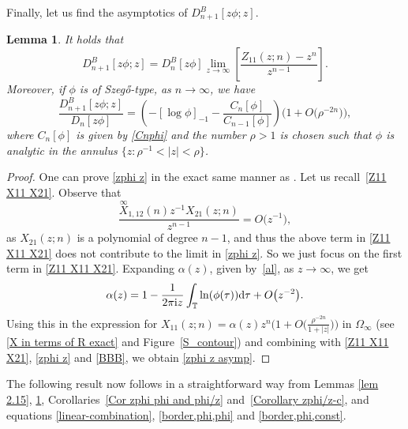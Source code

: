 \documentclass[10pt,a4paper]{amsart}
\numberwithin{equation}{section}
\newtheorem{Lemma}[Theorem]{Lemma}
 { \theoremstyle{definition}
\newtheorem{Definition}[Theorem]{Definition}
\newtheorem{Example}[Theorem]{Example}
\newtheorem{Remark}[Theorem]{Remark}
\newtheorem{Question}[Theorem]{Question}
}
\newcommand{\T}{{\mathbb T}}
\newcommand{\al}{\alpha}
\newcommand{\Om}{\Omega}
\newcommand{\ii}{{\rm i}}
\newcommand{\dd}{{\rm d}}
\begin{document}
		Finally, let us find the asymptotics of $D^B_{n+1}[z\phi;z]$.
		\begin{Lemma}\label{lem 2.16} It holds that
			\begin{equation}\label{zphi z}
				D^B_{n+1}[z\phi;z] = D^B_{n}[z\phi] \lim_{z \to \infty} \left[ \frac{Z_{11}(z;n)-z^n}{z^{n-1}} \right].
			\end{equation}
			Moreover, if $\phi$ is of Szeg\H{o}-type, as $n \to \infty$, we have
			\begin{equation}\label{zphi z asymp}
				\frac{D^B_{n+1}\left[z\phi;z\right]}{D_n[z\phi]}		 = \left( - [\log \phi]_{-1} - \frac{C_n[\phi]}{C_{n-1}[\phi]} \right) \big(1 + O\big(\rho^{-2n}\big)\big),
			\end{equation}
			where $C_n[\phi]$ is given by \eqref{Cnphi} and	the number $\rho>1$ is chosen such that $\phi$ is analytic in the annulus $\big\{z\colon \rho^{-1}<|z|<\rho\big\}$.
		\end{Lemma}
		\begin{proof}
			One can prove \eqref{zphi z} in the exact same manner as \cite[equation (2.16)]{BEGIL}. Let us recall~\eqref{Z11 X11 X21}. Observe that
 \[
 \frac{\overset{\infty}{X}_{1,12}(n) z^{-1} X_{21}(z;n)}{z^{n-1}} = O\big(z^{-1}\big),
 \]
 as $X_{21}(z;n)$ is a polynomial of degree $n-1$, and thus the above term in \eqref{Z11 X11 X21} does not contribute to the limit in \eqref{zphi z}. So we just focus on the first term in \eqref{Z11 X11 X21}. Expanding $\al(z)$, given by~\eqref{al}, as $z \to \infty $, we get
			\begin{gather*}%
				\al(z) = 1 - \frac{1}{2\pi \ii z} \int_{\T} \ln (\phi(\tau)) \dd \tau + O\big(z^{-2}\big).
			\end{gather*}
			Using this in the expression for $X_{11}(z;n) = \al(z) z^n \big(1 + O \big(\frac{\rho^{-2n}}{1+|z|}\big)\big)$ in $\Om_{\infty}$ (see \eqref{X in terms of R exact} and Figure~\ref{S_contour}) and combining with \eqref{Z11 X11 X21}, \eqref{zphi z} and \eqref{BBB}, we obtain \eqref{zphi z asymp}.	
		\end{proof}

		The following result now follows in a straightforward way from Lemmas \ref{lem 2.15}, \ref{lem 2.16}, Corollaries~\ref{Cor zphi phi and phi/z} and~\ref{Corollary zphi/z-c}, and equations \eqref{linear-combination}, \eqref{border,phi,phi} and \eqref{border,phi,const}.
		
\end{document}

